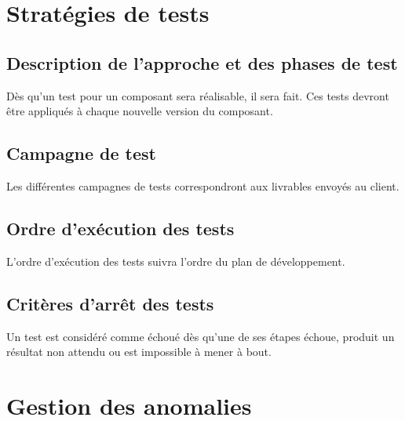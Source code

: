 \documentclass{../res/univ-projet}
\begin{document}
\section{Stratégies de tests}

\subsection{Description de l'approche et des phases de test}
Dès qu'un test pour un composant sera réalisable, il sera fait. Ces tests devront être appliqués à chaque nouvelle version du composant.


\subsection{Campagne de test}

Les différentes campagnes de tests correspondront aux livrables envoyés au client.

\subsection{Ordre d'exécution des tests}

L'ordre d'exécution des tests suivra l'ordre du plan de développement.

\subsection{Critères d'arrêt des tests}

Un test est considéré comme échoué dès qu'une de ses étapes échoue, produit un résultat non attendu ou est impossible à mener à bout.


\section{Gestion des anomalies}
\end{document}
